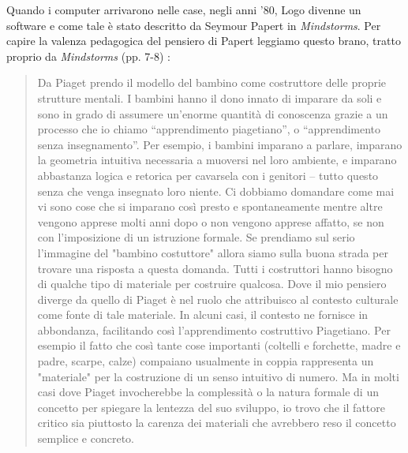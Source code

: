 Quando i computer arrivarono nelle case, negli anni '80, Logo divenne un software e come tale è stato descritto da Seymour Papert  in \textit{Mindstorms}. Per capire la valenza pedagogica del pensiero di Papert leggiamo questo brano, tratto proprio da \textit{Mindstorms} (pp. 7-8) \cite{Papert}:

\begin{quote}
Da Piaget prendo il modello del bambino come costruttore delle proprie strutture mentali. I bambini hanno il dono innato di imparare da soli e sono in grado di assumere un'enorme quantità di conoscenza grazie a un processo che io chiamo “apprendimento piagetiano”, o “apprendimento senza insegnamento”. Per esempio, i bambini imparano a parlare, imparano la geometria intuitiva necessaria a muoversi nel loro ambiente, e imparano abbastanza logica e retorica per cavarsela con i genitori – tutto questo senza che venga insegnato loro niente. Ci dobbiamo domandare come mai vi sono cose che si imparano così presto e spontaneamente mentre altre vengono apprese molti anni dopo o non vengono apprese affatto, se non con l'imposizione di un istruzione formale.  Se prendiamo sul serio l'immagine del "bambino costuttore" allora siamo sulla buona strada per trovare una risposta a questa domanda. Tutti i costruttori hanno bisogno di qualche tipo di materiale per costruire qualcosa. Dove il mio pensiero diverge da quello di Piaget è nel ruolo che attribuisco al contesto culturale come fonte di tale materiale. In alcuni casi, il contesto ne fornisce in abbondanza, facilitando così l'apprendimento    costruttivo Piagetiano. Per esempio il fatto che così  tante  cose importanti (coltelli e forchette, madre e padre, scarpe, calze) compaiano usualmente in coppia rappresenta un "materiale" per la costruzione di un senso intuitivo di numero. Ma in molti casi dove Piaget invocherebbe la complessità o la natura formale di un concetto per spiegare la lentezza del suo sviluppo, io trovo che il fattore critico sia piuttosto la carenza dei materiali  che avrebbero reso il concetto semplice e concreto. 
\end{quote}

